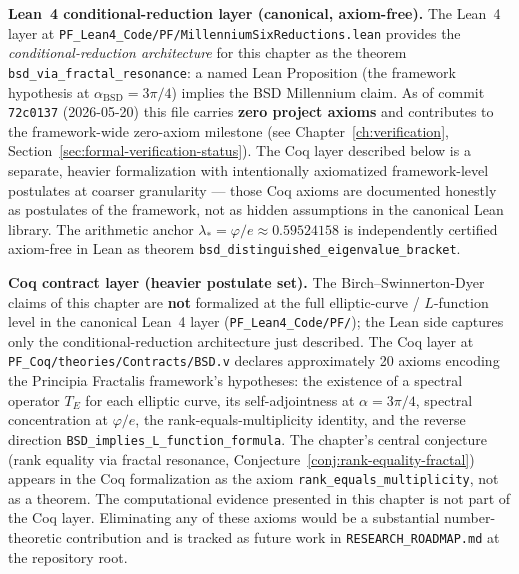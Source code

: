\begin{remark}
\textbf{Lean~4 conditional-reduction layer (canonical, axiom-free).} The Lean~4 layer at \texttt{PF\_Lean4\_Code/PF/MillenniumSixReductions.lean} provides the \emph{conditional-reduction architecture} for this chapter as the theorem \texttt{bsd\_via\_fractal\_resonance}: a named Lean Proposition (the framework hypothesis at $\alpha_{\mathrm{BSD}} = 3\pi/4$) implies the BSD Millennium claim. As of commit \texttt{72c0137} (2026-05-20) this file carries \textbf{zero project axioms} and contributes to the framework-wide zero-axiom milestone (see Chapter~\ref{ch:verification}, Section~\ref{sec:formal-verification-status}). The Coq layer described below is a separate, heavier formalization with intentionally axiomatized framework-level postulates at coarser granularity --- those Coq axioms are documented honestly as postulates of the framework, not as hidden assumptions in the canonical Lean library. The arithmetic anchor $\lambda_* = \varphi/e \approx 0.59524158$ is independently certified axiom-free in Lean as theorem \texttt{bsd\_distinguished\_eigenvalue\_bracket}.

\medskip
\textbf{Coq contract layer (heavier postulate set).}
The Birch--Swinnerton-Dyer claims of this chapter are \textbf{not} formalized at the full elliptic-curve / $L$-function level in the canonical Lean~4 layer (\texttt{PF\_Lean4\_Code/PF/}); the Lean side captures only the conditional-reduction architecture just described. The Coq layer at \texttt{PF\_Coq/theories/Contracts/BSD.v} declares approximately 20 axioms encoding the Principia Fractalis framework's hypotheses: the existence of a spectral operator $T_E$ for each elliptic curve, its self-adjointness at $\alpha = 3\pi/4$, spectral concentration at $\varphi/e$, the rank-equals-multiplicity identity, and the reverse direction \texttt{BSD\_implies\_L\_function\_formula}. The chapter's central conjecture (rank equality via fractal resonance, Conjecture~\ref{conj:rank-equality-fractal}) appears in the Coq formalization as the axiom \texttt{rank\_equals\_multiplicity}, not as a theorem. The computational evidence presented in this chapter is not part of the Coq layer. Eliminating any of these axioms would be a substantial number-theoretic contribution and is tracked as future work in \texttt{RESEARCH\_ROADMAP.md} at the repository root.
\end{remark}


